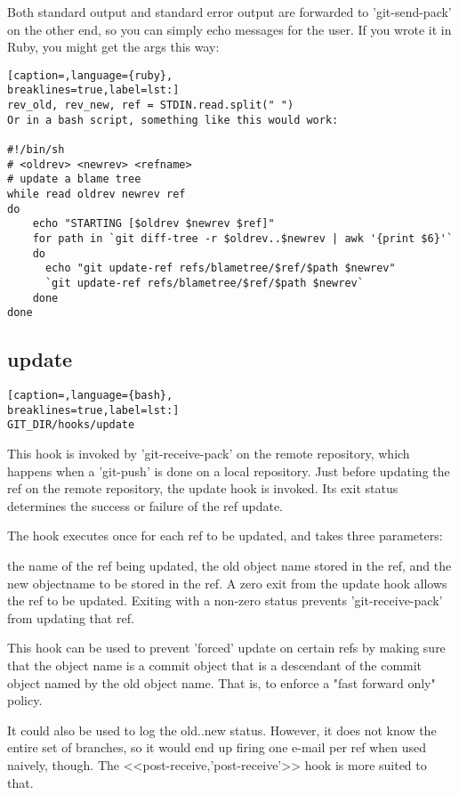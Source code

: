 Both standard output and standard error output are forwarded to 'git-send-pack'
on the other end, so you can simply echo messages for the user.
If you wrote it in Ruby, you might get the args this way:
\lstset{basicstyle=\scriptsize, numbers=none, captionpos=b, tabsize=4}
\begin{lstlisting}[caption=,language={ruby},
breaklines=true,label=lst:]
rev_old, rev_new, ref = STDIN.read.split(" ")
Or in a bash script, something like this would work:

#!/bin/sh
# <oldrev> <newrev> <refname>
# update a blame tree
while read oldrev newrev ref
do
    echo "STARTING [$oldrev $newrev $ref]"
    for path in `git diff-tree -r $oldrev..$newrev | awk '{print $6}'`
    do
      echo "git update-ref refs/blametree/$ref/$path $newrev"
      `git update-ref refs/blametree/$ref/$path $newrev`
    done
done
\end{lstlisting}

\subsection{update}
\lstset{basicstyle=\scriptsize, numbers=none, captionpos=b, tabsize=4}
\begin{lstlisting}[caption=,language={bash},
breaklines=true,label=lst:]
GIT_DIR/hooks/update
\end{lstlisting}

This hook is invoked by 'git-receive-pack' on the remote repository, which
happens when a 'git-push' is done on a local repository. Just before updating
the ref on the remote repository, the update hook is invoked. Its exit status
determines the success or failure of the ref update.

The hook executes once for each ref to be updated, and takes three parameters:

the name of the ref being updated, the old object name stored in the ref, and
the new objectname to be stored in the ref.  A zero exit from the update hook
allows the ref to be updated. Exiting with a non-zero status prevents
'git-receive-pack' from updating that ref.

This hook can be used to prevent 'forced' update on certain refs by making sure
that the object name is a commit object that is a descendant of the commit
object named by the old object name. That is, to enforce a "fast forward only"
policy.

It could also be used to log the old..new status. However, it does not know the
entire set of branches, so it would end up firing one e-mail per ref when used
naively, though. The <<post-receive,'post-receive'>> hook is more suited to
that.

